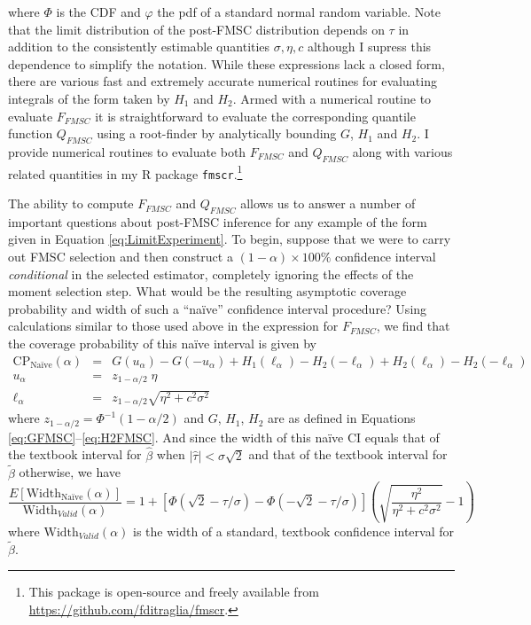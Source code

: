 where $\Phi$ is the CDF and $\varphi$ the pdf of a standard normal random variable.
Note that the limit distribution of the post-FMSC distribution depends on $\tau$ in addition to the consistently estimable quantities $\sigma, \eta, c$ although I supress this dependence to simplify the notation.
While these expressions lack a closed form, there are various fast and extremely accurate numerical routines for evaluating integrals of the form taken by $H_1$ and $H_2$.
Armed with a numerical routine to evaluate $F_{FMSC}$ it is straightforward to evaluate the corresponding quantile function $Q_{FMSC}$ using a root-finder by analytically bounding $G$, $H_1$ and $H_2$.
I provide numerical routines to evaluate both $F_{FMSC}$ and $Q_{FMSC}$ along with various related quantities in my R package \texttt{fmscr}.\footnote{This package is open-source and freely available from \url{https://github.com/fditraglia/fmscr}.}

The ability to compute $F_{FMSC}$ and $Q_{FMSC}$ allows us to answer a number of important questions about post-FMSC inference for any example of the form given in Equation \ref{eq:LimitExperiment}.
To begin, suppose that we were to carry out FMSC selection and then construct a $(1 - \alpha) \times 100\%$ confidence interval \emph{conditional} in the selected estimator, completely ignoring the effects of the moment selection step.
What would be the resulting asymptotic coverage probability and width of such a ``na\"{i}ve'' confidence interval procedure?
Using calculations similar to those used above in the expression for $F_{FMSC}$, we find that the coverage probability of this na\"{i}ve interval is given by
\begin{eqnarray*}
  \mbox{CP}_{\mbox{Na\"{i}ve}}(\alpha) &=& G(u_\alpha) - G(-u_\alpha) +  H_1(\ell_\alpha) - H_2(-\ell_\alpha) +  H_2(\ell_\alpha) - H_2(-\ell_\alpha) \\
  u_\alpha &=& z_{1-\alpha/2}\; \eta\\
  \ell_{\alpha} &=& z_{1-\alpha/2} \sqrt{\eta^2 + c^2\sigma^2}
\end{eqnarray*}
where $z_{1-\alpha/2} = \Phi^{-1}(1 -\alpha/2)$ and $G$, $H_1$, $H_2$ are as defined in Equations \ref{eq:GFMSC}--\ref{eq:H2FMSC}.
And since the width of this na\"{i}ve CI equals that of the textbook interval for $\widehat{\beta}$ when $|\widehat{\tau}|<\sigma\sqrt{2}$ and that of the textbook interval for $\widetilde{\beta}$ otherwise, we have
\begin{equation*}
  \frac{E\left[ \mbox{Width}_{\mbox{Na\"{i}ve}}(\alpha) \right]}{\mbox{Width}_{Valid}(\alpha)} = 1 + \left[ \Phi( \sqrt{2} - \tau/\sigma) -  \Phi( -\sqrt{2} - \tau/\sigma )\right]\left( \sqrt{\frac{\eta^2}{\eta^2 + c^2 \sigma^2}} - 1 \right)
\end{equation*}
where $\mbox{Width}_{Valid}(\alpha)$ is the width of a standard, textbook confidence interval for $\widetilde{\beta}$.

